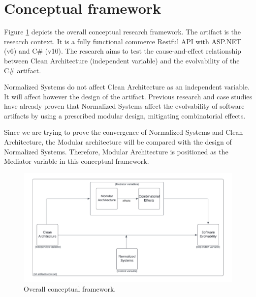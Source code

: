\section{Conceptual framework} 
\label{conceptualframework}

Figure \ref{fig_conceptual_framework} depicts the overall conceptual research framework.
The artifact is the research context. It is a fully functional commerce Restful API with
ASP.NET (v6) and C\# (v10). The research aims to test the cause-and-effect relationship
between Clean Architecture (independent variable) and the evolvability of the C\#
artifact.

Normalized Systems do not affect Clean Architecture as an independent
variable. It will affect however the design of the artifact. Previous research and case
studies have already proven that Normalized Systems affect the evolvability of software
artifacts by using a prescribed modular design, mitigating combinatorial effects.

Since we are trying to prove the convergence of Normalized Systems and Clean
Architecture, the Modular architecture will be compared with the design of Normalized
Systems. Therefore, Modular Architecture is positioned as the Mediator variable in this
conceptual framework.

\begin{figure}[!ht]
    \centering
    \includegraphics[width=1\textwidth]{Figures/conceptual_framework}
    \caption[Overall conceptual framework]{Overall conceptual framework.}
    \label{fig_conceptual_framework}
\end{figure}
